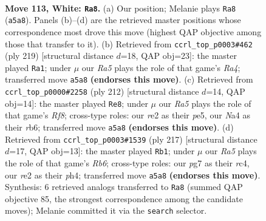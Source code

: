 \documentclass[11pt]{article}
\begin{document}
\clearpage

\begin{figure}[p]\centering
\begin{subfigure}{0.46\textwidth}\centering
\resizebox{\linewidth}{!}{%
\newchessgame
\chessboard[
  setfen={8/6p1/5p1k/R6p/N6P/6PK/4r3/8 w - - 50 113},
  showmover=false,
  pgfstyle=straightmove, color=movearrow, markmove={a5-a8}
]}
\caption{}
\end{subfigure}\hfill
\begin{subfigure}{0.46\textwidth}\centering
\resizebox{\linewidth}{!}{%
\newchessgame
\chessboard[
  setfen={8/5pk1/7p/r6P/4KPP1/1R6/8/8 b - - 26 110},
  showmover=false,
  pgfstyle=straightmove, color=movearrow, markmove={a5-a1}
]}
\caption{}
\end{subfigure}
\\[4pt]
\begin{subfigure}{0.46\textwidth}\centering
\resizebox{\linewidth}{!}{%
\newchessgame
\chessboard[
  setfen={5R2/8/1r4k1/4p1p1/5pP1/5P2/4PK2/8 w - - 16 107},
  showmover=false,
  pgfstyle=straightmove, color=movearrow, markmove={f8-e8}
]}
\caption{}
\end{subfigure}\hfill
\begin{subfigure}{0.46\textwidth}\centering
\resizebox{\linewidth}{!}{%
\newchessgame
\chessboard[
  setfen={8/8/6pk/7p/2R1K2P/1r3PP1/8/8 b - - 85 109},
  showmover=false,
  pgfstyle=straightmove, color=movearrow, markmove={b3-b1}
]}
\caption{}
\end{subfigure}
\caption{\textbf{Move 113, White: \texttt{Ra8}.} (a) Our position; Melanie plays \texttt{Ra8} (\texttt{a5a8}). Panels (b)--(d) are the retrieved master positions whose correspondence most drove this move (highest QAP objective among those that transfer to it). (b) Retrieved from \texttt{ccrl\_top\_p0003\#462} (ply 219) [structural distance $d$=18, QAP obj=23]: the master played \texttt{Ra1}; under $\mu$ our \emph{Ra5} plays the role of that game's \emph{Ra4}; transferred move \texttt{a5a8} \textbf{(endorses this move)}. (c) Retrieved from \texttt{ccrl\_top\_p0000\#2258} (ply 212) [structural distance $d$=14, QAP obj=14]: the master played \texttt{Re8}; under $\mu$ our \emph{Ra5} plays the role of that game's \emph{Rf8}; cross-type roles: our \emph{r}e2 as their \emph{p}e5, our \emph{N}a4 as their \emph{r}b6; transferred move \texttt{a5a8} \textbf{(endorses this move)}. (d) Retrieved from \texttt{ccrl\_top\_p0003\#1539} (ply 217) [structural distance $d$=17, QAP obj=13]: the master played \texttt{Rb1}; under $\mu$ our \emph{Ra5} plays the role of that game's \emph{Rb6}; cross-type roles: our \emph{p}g7 as their \emph{r}c4, our \emph{r}e2 as their \emph{p}h4; transferred move \texttt{a5a8} \textbf{(endorses this move)}. Synthesis: 6 retrieved analogs transferred to \texttt{Ra8} (summed QAP objective 85, the strongest correspondence among the candidate moves); Melanie committed it via the \texttt{search} selector.}
\label{fig:thought-m224}
\end{figure}
\end{document}
